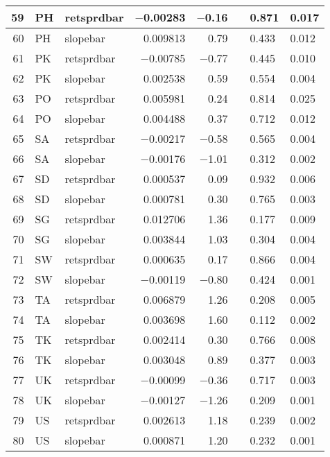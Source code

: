 \begin{longtable}{|r|l|l|r|r|l|l|l|}
   59 &    PH &    retsprdbar &    $-$0.00283 &    $-$0.16 &      &    0.871 &    0.017\\\hline
   60 &    PH &    slopebar &    0.009813 &    0.79 &      &    0.433 &    0.012\\\hline
   61 &    PK &    retsprdbar &    $-$0.00785 &    $-$0.77 &      &    0.445 &    0.010\\\hline
   62 &    PK &    slopebar &    0.002538 &    0.59 &      &    0.554 &    0.004\\\hline
   63 &    PO &    retsprdbar &    0.005981 &    0.24 &      &    0.814 &    0.025\\\hline
   64 &    PO &    slopebar &    0.004488 &    0.37 &      &    0.712 &    0.012\\\hline
   65 &    SA &    retsprdbar &    $-$0.00217 &    $-$0.58 &      &    0.565 &    0.004\\\hline
   66 &    SA &    slopebar &    $-$0.00176 &    $-$1.01 &      &    0.312 &    0.002\\\hline
   67 &    SD &    retsprdbar &    0.000537 &    0.09 &      &    0.932 &    0.006\\\hline
   68 &    SD &    slopebar &    0.000781 &    0.30 &      &    0.765 &    0.003\\\hline
   69 &    SG &    retsprdbar &    0.012706 &    1.36 &      &    0.177 &    0.009\\\hline
   70 &    SG &    slopebar &    0.003844 &    1.03 &      &    0.304 &    0.004\\\hline
   71 &    SW &    retsprdbar &    0.000635 &    0.17 &      &    0.866 &    0.004\\\hline
   72 &    SW &    slopebar &    $-$0.00119 &    $-$0.80 &      &    0.424 &    0.001\\\hline
   73 &    TA &    retsprdbar &    0.006879 &    1.26 &      &    0.208 &    0.005\\\hline
   74 &    TA &    slopebar &    0.003698 &    1.60 &      &    0.112 &    0.002\\\hline
   75 &    TK &    retsprdbar &    0.002414 &    0.30 &      &    0.766 &    0.008\\\hline
   76 &    TK &    slopebar &    0.003048 &    0.89 &      &    0.377 &    0.003\\\hline
   77 &    UK &    retsprdbar &    $-$0.00099 &    $-$0.36 &      &    0.717 &    0.003\\\hline
   78 &    UK &    slopebar &    $-$0.00127 &    $-$1.26 &      &    0.209 &    0.001\\\hline
   79 &    US &    retsprdbar &    0.002613 &    1.18 &      &    0.239 &    0.002\\\hline
   80 &    US &    slopebar &    0.000871 &    1.20 &      &    0.232 &    0.001\\\hline
\end{longtable}

